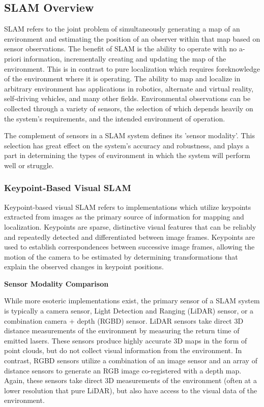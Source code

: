 \subsection{SLAM Overview}

SLAM refers to the joint problem of simultaneously generating a map of an environment and estimating the position of an observer within that map based on sensor observations. The benefit of SLAM is the ability to operate with no a-priori information, incrementally creating and updating the map of the environment. This is in contrast to pure localization which requires foreknowledge of the environment where it is operating. The ability to map and localize in arbitrary environment has applications in robotics, alternate and virtual reality, self-driving vehicles, and many other fields. Environmental observations can be collected through a variety of sensors, the selection of which depends heavily on the system's requirements, and the intended environment of operation.

The complement of sensors in a SLAM system defines its 'sensor modality'. This selection has great effect on the system's accuracy and robustness, and plays a part in determining the types of environment in which the system will perform well or struggle.

\subsubsection{Keypoint-Based Visual SLAM}

Keypoint-based visual SLAM refers to implementations which utilize keypoints extracted from images as the primary source of information for mapping and localization. Keypoints are sparse, distinctive visual features that can be reliably and repeatedly detected and differentiated between image frames. Keypoints are used to establish correspondences between successive image frames, allowing the motion of the camera to be estimated by determining transformations that explain the observed changes in keypoint positions.


\textbf{Sensor Modality Comparison}


While more esoteric implementations exist, the primary sensor of a SLAM system is typically a camera sensor, Light Detection and Ranging (LiDAR) sensor, or a combination camera + depth (RGBD) sensor. LiDAR sensors take direct 3D distance measurements of the environment by measuring the return time of emitted lasers. These sensors produce highly accurate 3D maps in the form of point clouds, but do not collect visual information from the environment. In contrast, RGBD sensors utilize a combination of an image sensor and an array of distance sensors to generate an RGB image co-registered with a depth map. Again, these sensors take direct 3D measurements of the environment (often at a lower resolution that pure LiDAR), but also have access to the visual data of the environment.

